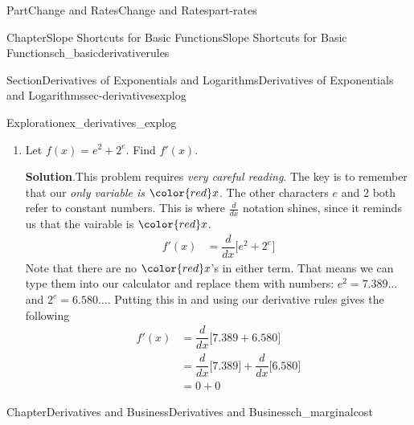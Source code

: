 \documentclass[oneside,10pt,]{tufte-book}
\newcommand{\blocktitlefont}{\relax}
\numberwithin{equation}{chapter}
\newcommand{\red}[1]{   {\color{red}   #1}   }
\newcommand{\blue}[1]{  {\color{blue}  #1}  }
\newcommand{\ddx}[1]{ \dfrac{d}{dx} \Big[ #1 \Big]  }
\newcommand{\amp}{&}
\begin{document}
\begin{partptx}{Part}{Change and Rates}{}{Change and Rates}{}{}{part-rates}
\begin{chapterptx}{Chapter}{Slope Shortcuts for Basic Functions}{}{Slope Shortcuts for Basic Functions}{}{}{ch_basicderivativerules}
\begin{sectionptx}{Section}{Derivatives of Exponentials and Logarithms}{}{Derivatives of Exponentials and Logarithms}{}{}{sec-derivativesexplog}
\begin{exploration}{Exploration}{}{ex_derivatives_explog}
\begin{enumerate}[font=\bfseries,label=(\alph*),ref=\alph*]
\begin{equation*}
\end{equation*}
In the second term, \(x\) is in the base, so use the power rule with \(\blue m = \blue e = \blue 2.718\dots\)%
\begin{equation*}
\ddx{{\red x}^{\blue m} = \blue m {\red x}^{\blue m - 1}}
\end{equation*}
Putting this all together  gives the following%
\begin{align*}
f'(x) \amp = \ddx{ e^{\red x} + {\red x}^e} \\
\amp = \ddx{e^{\red x}} + \ddx{{\red x}^e}  \\
\amp = e^{\red x} + {\blue e}{\red x}^{\blue e-1}  
\end{align*}
%
\item{}Let \(f(x) = e^2 + 2^e\).  Find \(f'(x)\).%
\par\smallskip%
\noindent\textbf{\blocktitlefont Solution}.\hypertarget{ex_derivatives_explog-5-2}{}\quad{}This problem requires \emph{very careful reading}. The key is to remember that our \emph{only variable is \(\red x\)}.  The other characters \(e\) and \(2\) both refer to constant numbers. This is where \(\frac{d}{dx}\) notation shines, since it reminds us that the vairable is \(\red x\).%
\begin{align*}
f'(x) \amp = \ddx{  e^2 + 2^e} 
\end{align*}
Note that there are no \(\red x\)'s in either term.  That means we can type them into our calculator and replace them with numbers: \(e^2 = 7.389\dots\) and \(2^e = 6.580\dots\).  Putting this in and using our derivative rules gives the following%
\begin{align*}
f'(x) \amp = \ddx{  7.389 + 6.580} \\
\amp = \ddx{7.389} + \ddx{6.580} \\
\amp = 0 + 0 
\end{align*}
%
\end{enumerate}%
\end{exploration}%
\end{sectionptx}
\end{chapterptx}
%
\typeout{************************************************}
\typeout{************************************************}
%
\begin{chapterptx}{Chapter}{Derivatives and Business}{}{Derivatives and Business}{}{}{ch_marginalcost}
\renewcommand*{\chaptername}{Chapter}
%
%
\typeout{************************************************}

\end{chapterptx}
\end{partptx}
\end{document}
